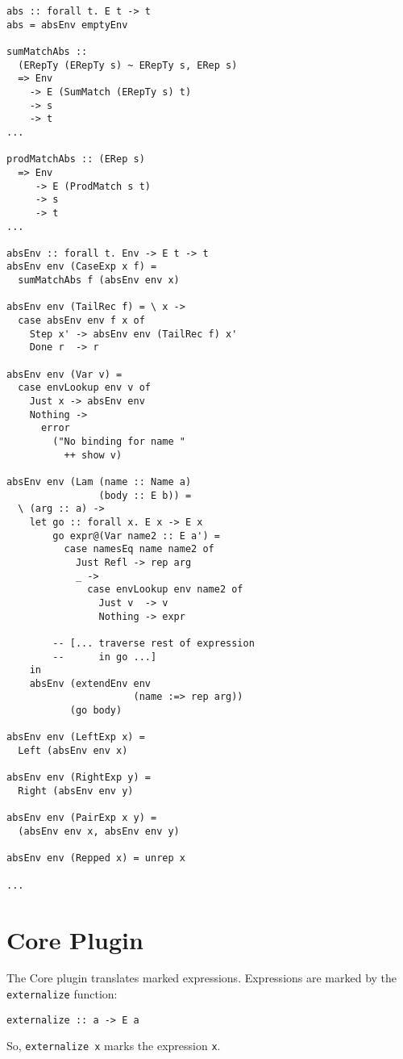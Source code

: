 \documentclass[sigplan,screen]{acmart}
\newcommand{\ttt}{\texttt}
\begin{document}
\begin{lstlisting}
abs :: forall t. E t -> t
abs = absEnv emptyEnv

sumMatchAbs ::
  (ERepTy (ERepTy s) ~ ERepTy s, ERep s)
  => Env
    -> E (SumMatch (ERepTy s) t)
    -> s
    -> t
...

prodMatchAbs :: (ERep s)
  => Env
     -> E (ProdMatch s t)
     -> s
     -> t
...

absEnv :: forall t. Env -> E t -> t
absEnv env (CaseExp x f) =
  sumMatchAbs f (absEnv env x)

absEnv env (TailRec f) = \ x ->
  case absEnv env f x of
    Step x' -> absEnv env (TailRec f) x'
    Done r  -> r

absEnv env (Var v) =
  case envLookup env v of
    Just x -> absEnv env
    Nothing ->
      error
        ("No binding for name "
          ++ show v)

absEnv env (Lam (name :: Name a)
                (body :: E b)) =
  \ (arg :: a) ->
    let go :: forall x. E x -> E x
        go expr@(Var name2 :: E a') =
          case namesEq name name2 of
            Just Refl -> rep arg
            _ ->
              case envLookup env name2 of
                Just v  -> v
                Nothing -> expr

        -- [... traverse rest of expression
        --      in go ...]
    in
    absEnv (extendEnv env
                      (name :=> rep arg))
           (go body)

absEnv env (LeftExp x) =
  Left (absEnv env x)

absEnv env (RightExp y) =
  Right (absEnv env y)

absEnv env (PairExp x y) =
  (absEnv env x, absEnv env y)

absEnv env (Repped x) = unrep x

...
\end{lstlisting}


\section{Core Plugin}

The Core plugin translates marked expressions. Expressions are marked by
the \ttt{externalize} function:

\begin{lstlisting}
externalize :: a -> E a
\end{lstlisting}

So, \ttt{externalize x} marks the expression \ttt{x}.
\end{document}
